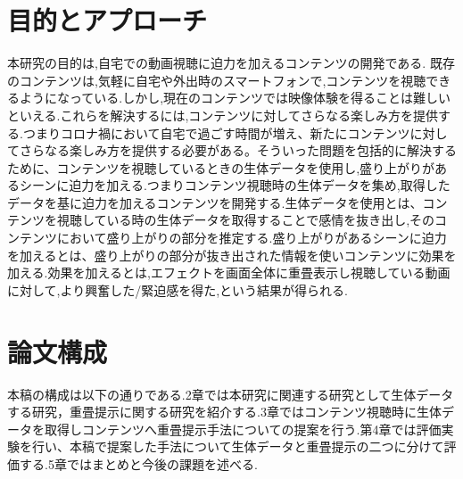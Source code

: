 \section{目的とアプローチ}
本研究の目的は,自宅での動画視聴に迫力を加えるコンテンツの開発である.
既存のコンテンツは,気軽に自宅や外出時のスマートフォンで,コンテンツを視聴できるようになっている.しかし,現在のコンテンツでは映像体験を得ることは難しいといえる.これらを解決するには,コンテンツに対してさらなる楽しみ方を提供する.つまりコロナ禍において自宅で過ごす時間が増え、新たにコンテンツに対してさらなる楽しみ方を提供する必要がある。そういった問題を包括的に解決するために、コンテンツを視聴しているときの生体データを使用し,盛り上がりがあるシーンに迫力を加える.つまりコンテンツ視聴時の生体データを集め,取得したデータを基に迫力を加えるコンテンツを開発する.生体データを使用とは、コンテンツを視聴している時の生体データを取得することで感情を抜き出し,そのコンテンツにおいて盛り上がりの部分を推定する.盛り上がりがあるシーンに迫力を加えるとは、盛り上がりの部分が抜き出された情報を使いコンテンツに効果を加える.効果を加えるとは,エフェクトを画面全体に重畳表示し視聴している動画に対して,より興奮した/緊迫感を得た,という結果が得られる.

\section{論文構成}
本稿の構成は以下の通りである.2章では本研究に関連する研究として生体データする研究，重畳提示に関する研究を紹介する.3章ではコンテンツ視聴時に生体データを取得しコンテンツへ重畳提示手法についての提案を行う.第4章では評価実験を行い、本稿で提案した手法について生体データと重畳提示の二つに分けて評価する.5章ではまとめと今後の課題を述べる.

